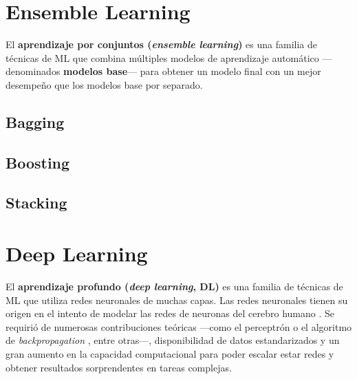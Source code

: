 
\section{Ensemble Learning}

El \textbf{aprendizaje por conjuntos (\textit{ensemble learning})} es una familia de técnicas de ML que 
combina múltiples modelos de aprendizaje automático ---denominados \textbf{modelos base}--- para obtener un 
modelo final con un mejor desempeño que los modelos base por separado.

\subsection{Bagging}


\subsection{Boosting}


\subsection{Stacking}



\section{Deep Learning}

El \textbf{aprendizaje profundo (\textit{deep learning}, DL)} es una familia de técnicas de ML que utiliza
redes neuronales de muchas capas. 
Las redes neuronales tienen su origen en el intento de modelar las redes de neuronas del cerebro humano 
\cite{mcculloch1943}. Se requirió de numerosas contribuciones teóricas ---como el perceptrón 
\cite{rosenblatt1958} o el algoritmo de \textit{backpropagation} \cite{rumelhart1986,werbos1994}, entre 
otras---, disponibilidad de datos estandarizados y un gran aumento en la capacidad computacional para poder 
escalar estar redes y obtener resultados 
sorprendentes en tareas complejas.

